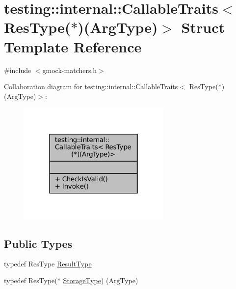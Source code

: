 \hypertarget{structtesting_1_1internal_1_1CallableTraits_3_01ResType_07_5_08_07ArgType_08_4}{}\section{testing\+:\+:internal\+:\+:Callable\+Traits$<$ Res\+Type($\ast$)(Arg\+Type)$>$ Struct Template Reference}
\label{structtesting_1_1internal_1_1CallableTraits_3_01ResType_07_5_08_07ArgType_08_4}


{\ttfamily \#include $<$gmock-\/matchers.\+h$>$}



Collaboration diagram for testing\+:\+:internal\+:\+:Callable\+Traits$<$ Res\+Type($\ast$)(Arg\+Type)$>$\+:
\nopagebreak
\begin{figure}[H]
\begin{center}
\leavevmode
\includegraphics[width=214pt]{structtesting_1_1internal_1_1CallableTraits_3_01ResType_07_5_08_07ArgType_08_4__coll__graph}
\end{center}
\end{figure}
\subsection*{Public Types}
\begin{DoxyCompactItemize}
\item 
typedef Res\+Type \hyperlink{structtesting_1_1internal_1_1CallableTraits_3_01ResType_07_5_08_07ArgType_08_4_a1959235d286e9c9bb57c1c1139a0cbd8}{Result\+Type}
\item 
typedef Res\+Type($\ast$ \hyperlink{structtesting_1_1internal_1_1CallableTraits_3_01ResType_07_5_08_07ArgType_08_4_a0ee48af3b40e5c5bcb48a78cdacf6d9c}{Storage\+Type}) (Arg\+Type)
\end{DoxyCompactItemize}
